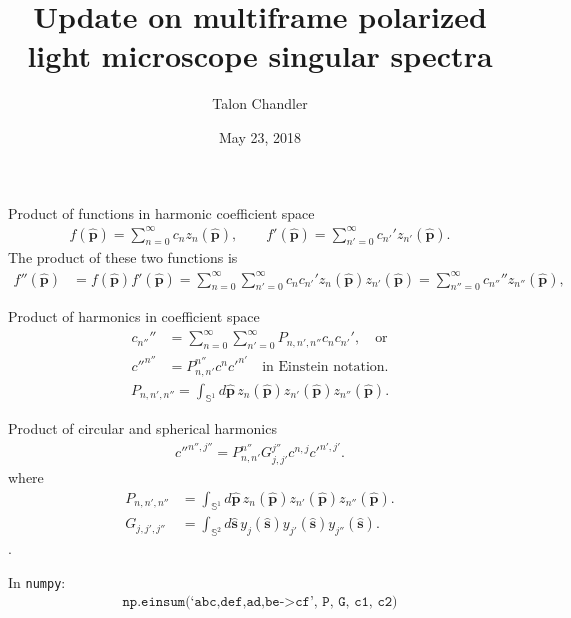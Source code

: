 \documentclass[presentation]{beamer}
\author{Talon Chandler}
\date{May 23, 2018}
\title{Update on multiframe polarized light microscope singular spectra}
\providecommand{\mh}[1]{\mathbf{\hat{#1}}}
\providecommand{\mbb}[1]{\mathbb{#1}}
\begin{document}
\maketitle
\begin{frame}{Product of functions in harmonic coefficient space}
  \begin{align}
  f(\mh{p}) = \sum_{n=0}^\infty c_nz_n(\mh{p}), \qquad f'(\mh{p}) = \sum_{n'=0}^\infty c_{n'}'z_{n'}(\mh{p}). 
  \end{align}
The product of these two functions is
\begin{align}
  f''(\mh{p}) &= f(\mh{p})f'(\mh{p})=\sum_{n=0}^\infty \sum_{n'=0}^\infty c_n c_{n'}' z_n(\mh{p}) z_{n'}(\mh{p}) = \sum_{n''=0}^{\infty} c_{n''}''z_{n''}(\mh{p}), \label{eq:two}
  \end{align}
\end{frame}

\begin{frame}{Product of harmonics in coefficient space}
    \begin{align}
      c_{n''}'' &= \sum_{n=0}^\infty \sum_{n'=0}^\infty P_{n,n',n''} c_n c_{n'}',\quad \text{or}\\
      {c''}^{n''} &= P^{n''}_{n,n'} c^{n} {c'}^{n'}\quad \text{in Einstein notation.}
    \end{align}
    \begin{align}
    P_{n,n',n''} = \int_{\mbb{S}^1}d\mh{p}\, z_{n}(\mh{p})z_{n'}(\mh{p})z_{n''}(\mh{p}).\label{eq:triple}
    \end{align}
  \end{frame}

\begin{frame}{Product of circular and spherical harmonics}
\begin{align}
  {c''}^{n'', j''} = P_{n,n'}^{n''} G_{j,j'}^{j''} c^{n,j} {c'}^{n', j'}.\label{eq:final}
\end{align}
where
\begin{align}
  P_{n,n',n''} &= \int_{\mbb{S}^1}d\mh{p}\, z_{n}(\mh{p})z_{n'}(\mh{p})z_{n''}(\mh{p}).\label{eq:triple}\\
  G_{j,j',j''} &= \int_{\mbb{S}^2}d\mh{s}\, y_{j}(\mh{s})y_{j'}(\mh{s})y_{j''}(\mh{s}).
\end{align}.

In \texttt{numpy}:
\begin{align}
  \texttt{np.einsum(`abc,def,ad,be->cf', P, G, c1, c2)}
\end{align}
\end{frame}
\end{document}
